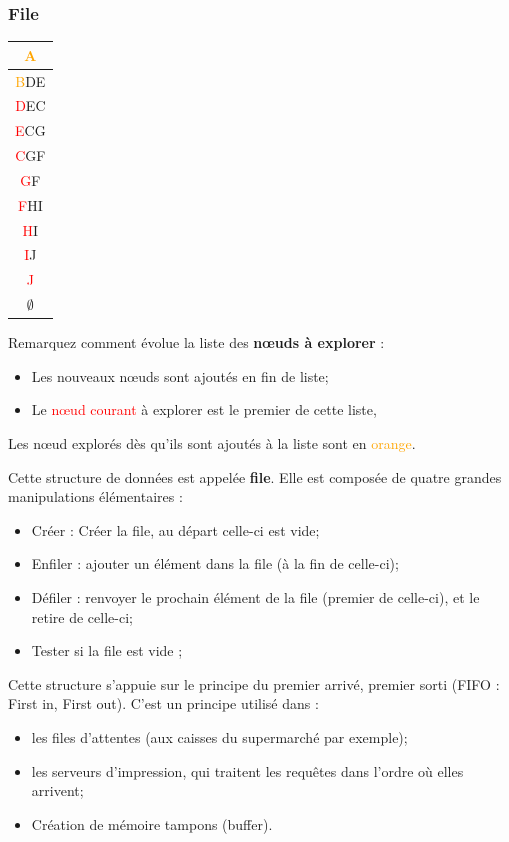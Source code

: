 \begin{frame}[fragile]
\frametitle{File}

\begin{minipage}{0.1\linewidth}
\begin{tabular}{|c|}
\hline
\textcolor{orange}{A} \\ \hline \textcolor{orange}{B}\textcolor{vertf}{DE}\\ \hline \textcolor{red}{D}E\textcolor{vertf}{C}\\ \hline \textcolor{red}{E}C\textcolor{vertf}{G}\\ \hline \textcolor{red}{C}G\textcolor{vertf}{F}\\ \hline \textcolor{red}{G}F\\ \hline \textcolor{red}{F}H\textcolor{vertf}{I}\\ \hline \textcolor{red}{H}I \\ \hline \textcolor{red}{I}\textcolor{vertf}{J} \\ \hline \textcolor{red}{J} \\ \hline $\emptyset$ \\ \hline
\end{tabular}
\end{minipage}\hfill
\begin{minipage}{0.85\linewidth}
Remarquez comment évolue la liste des \textbf{n\oe{}uds à explorer} :
\begin{itemize}
\item Les \textcolor{vertf}{nouveaux n\oe{}uds} sont ajoutés en fin de liste;
\item Le \textcolor{red}{n\oe{}ud courant} à explorer est le premier de cette liste,
\end{itemize}
Les n\oe{}ud explorés dès qu'ils sont ajoutés à la liste sont en \textcolor{orange}{orange}.

Cette structure de données est appelée \textbf{file}. Elle est composée de quatre grandes manipulations élémentaires :
\begin{itemize}
\item \og Créer \fg{} : Créer la file, au départ celle-ci est vide;
\item \og Enfiler \fg{} : ajouter un élément dans la file (à la fin de celle-ci); 
\item \og Défiler \fg{} : renvoyer le prochain élément de la file (premier de celle-ci), et le retire de celle-ci;
\item \og Tester si la file est vide \fg{};
\end{itemize}
\end{minipage}

Cette structure s'appuie sur le principe du premier arrivé, premier sorti (FIFO : First in, First out). C'est un principe utilisé dans :
\begin{itemize}
\item les files d'attentes (aux caisses du supermarché par exemple);
\item les serveurs d'impression, qui traitent les requêtes dans l'ordre où elles arrivent;
\item Création de mémoire tampons (buffer).
\end{itemize}
\end{frame}

